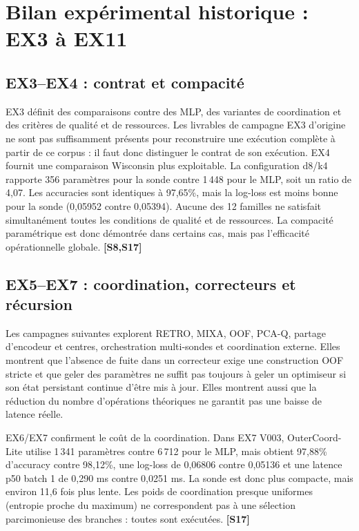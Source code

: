 \documentclass[11pt,a4paper]{article}
\newcommand{\src}[1]{\textbf{[#1]}}
\begin{document}
\section{Bilan expérimental historique : EX3 à EX11}

\subsection{EX3--EX4 : contrat et compacité}

EX3 définit des comparaisons contre des MLP, des variantes de coordination et des critères de qualité et de ressources. Les livrables de campagne EX3 d'origine ne sont pas suffisamment présents pour reconstruire une exécution complète à partir de ce corpus : il faut donc distinguer le contrat de son exécution. EX4 fournit une comparaison Wisconsin plus exploitable. La configuration d8/k4 rapporte 356 paramètres pour la sonde contre 1\,448 pour le MLP, soit un ratio de 4,07. Les accuracies sont identiques à 97,65\%, mais la log-loss est moins bonne pour la sonde (0,05952 contre 0,05394). Aucune des 12 familles ne satisfait simultanément toutes les conditions de qualité et de ressources. La compacité paramétrique est donc démontrée dans certains cas, mais pas l'efficacité opérationnelle globale. \src{S8,S17}

\subsection{EX5--EX7 : coordination, correcteurs et récursion}

Les campagnes suivantes explorent RETRO, MIXA, OOF, PCA-Q, partage d'encodeur et centres, orchestration multi-sondes et coordination externe. Elles montrent que l'absence de fuite dans un correcteur exige une construction OOF stricte et que geler des paramètres ne suffit pas toujours à geler un optimiseur si son état persistant continue d'être mis à jour. Elles montrent aussi que la réduction du nombre d'opérations théoriques ne garantit pas une baisse de latence réelle.

EX6/EX7 confirment le coût de la coordination. Dans EX7 V003, OuterCoord-Lite utilise 1\,341 paramètres contre 6\,712 pour le MLP, mais obtient 97,88\% d'accuracy contre 98,12\%, une log-loss de 0,06806 contre 0,05136 et une latence p50 batch 1 de 0,290 ms contre 0,0251 ms. La sonde est donc plus compacte, mais environ 11,6 fois plus lente. Les poids de coordination presque uniformes (entropie proche du maximum) ne correspondent pas à une sélection parcimonieuse des branches : toutes sont exécutées. \src{S17}
\end{document}
